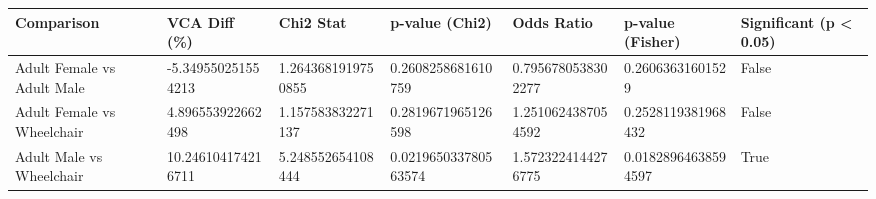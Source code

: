 \begin{tabular}{lllllll}
\hline
Comparison & VCA Diff (\%) & Chi2 Stat & p-value (Chi2) & Odds Ratio & p-value (Fisher) & Significant (p < 0.05) \\ \hline
Adult Female vs Adult Male & -5.349550251554213 & 1.2643681919750855 & 0.2608258681610759 & 0.7956780538302277 & 0.26063631601529 & False \\
Adult Female vs Wheelchair & 4.896553922662498 & 1.157583832271137 & 0.2819671965126598 & 1.2510624387054592 & 0.2528119381968432 & False \\
Adult Male vs Wheelchair & 10.246104174216711 & 5.248552654108444 & 0.021965033780563574 & 1.5723224144276775 & 0.01828964638594597 & True \\
\hline
\end{tabular}
